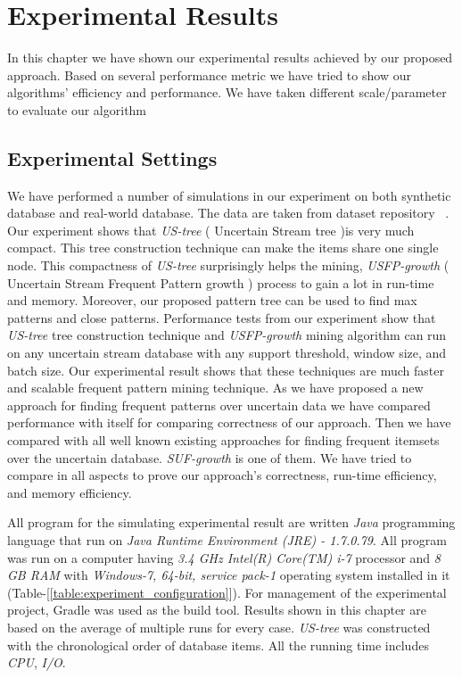 %
\chapter{Experimental Results}
In this chapter we have shown our experimental results achieved by our proposed approach. Based on several performance metric we have tried to show our algorithms' efficiency and performance. We have taken different scale/parameter to evaluate our algorithm


\section{Experimental Settings}
We have performed a number of simulations in our experiment on both synthetic database and real-world database. The data are taken from dataset repository ~\cite{dataset}. Our experiment shows that \emph{US-tree} ( Uncertain Stream tree )is very much compact. This tree construction technique can make the items share one single node. This compactness of \emph{US-tree} surprisingly helps the mining, \emph{USFP-growth} ( Uncertain Stream Frequent Pattern growth ) process to gain a lot in run-time and memory. Moreover, our proposed pattern tree can be used to find max patterns and close patterns. Performance tests from our experiment show that \emph{US-tree} tree construction technique and \emph{USFP-growth} mining algorithm can run on any uncertain stream database with any support threshold, window size, and batch size. Our experimental result shows that these techniques are much faster and scalable frequent pattern mining technique. As we have proposed a new approach for finding frequent patterns over uncertain data we have compared performance with itself for comparing correctness of our approach. Then we have compared with all well known existing approaches for finding frequent itemsets over the uncertain database. \emph{SUF-growth} is one of them. We have tried to compare in all aspects to prove our approach's correctness, run-time efficiency, and memory efficiency.

All program for the simulating experimental result are written \emph{Java} programming language that run on \emph{Java Runtime Environment (JRE) - 1.7.0.79}. All program was run on a computer having \emph{3.4 GHz Intel(R) Core(TM) i-7} processor and \emph{8 GB RAM} with \emph{Windows-7, 64-bit, service pack-1} operating system installed in it (Table-[\ref{table:experiment_configuration}]). For management of the experimental project, Gradle was used as the build tool. Results shown in this chapter are based on the average of multiple runs for every case. \emph{US-tree} was constructed with the chronological order of database items. All the running time includes \emph{CPU}, \emph{I/O}.\\

